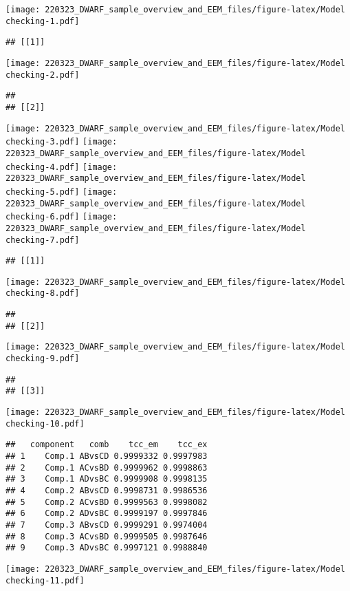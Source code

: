 \documentclass[
]{article}
\begin{document}
\texttt{[image: 220323\_DWARF\_sample\_overview\_and\_EEM\_files/figure-latex/Model checking-1.pdf]}

\begin{verbatim}
## [[1]]
\end{verbatim}

\texttt{[image: 220323\_DWARF\_sample\_overview\_and\_EEM\_files/figure-latex/Model checking-2.pdf]}

\begin{verbatim}
## 
## [[2]]
\end{verbatim}

\texttt{[image: 220323\_DWARF\_sample\_overview\_and\_EEM\_files/figure-latex/Model checking-3.pdf]}
\texttt{[image: 220323\_DWARF\_sample\_overview\_and\_EEM\_files/figure-latex/Model checking-4.pdf]}
\texttt{[image: 220323\_DWARF\_sample\_overview\_and\_EEM\_files/figure-latex/Model checking-5.pdf]}
\texttt{[image: 220323\_DWARF\_sample\_overview\_and\_EEM\_files/figure-latex/Model checking-6.pdf]}
\texttt{[image: 220323\_DWARF\_sample\_overview\_and\_EEM\_files/figure-latex/Model checking-7.pdf]}

\begin{verbatim}
## [[1]]
\end{verbatim}

\texttt{[image: 220323\_DWARF\_sample\_overview\_and\_EEM\_files/figure-latex/Model checking-8.pdf]}

\begin{verbatim}
## 
## [[2]]
\end{verbatim}

\texttt{[image: 220323\_DWARF\_sample\_overview\_and\_EEM\_files/figure-latex/Model checking-9.pdf]}

\begin{verbatim}
## 
## [[3]]
\end{verbatim}

\texttt{[image: 220323\_DWARF\_sample\_overview\_and\_EEM\_files/figure-latex/Model checking-10.pdf]}

\begin{verbatim}
##   component   comb    tcc_em    tcc_ex
## 1    Comp.1 ABvsCD 0.9999332 0.9997983
## 2    Comp.1 ACvsBD 0.9999962 0.9998863
## 3    Comp.1 ADvsBC 0.9999908 0.9998135
## 4    Comp.2 ABvsCD 0.9998731 0.9986536
## 5    Comp.2 ACvsBD 0.9999563 0.9998082
## 6    Comp.2 ADvsBC 0.9999197 0.9997846
## 7    Comp.3 ABvsCD 0.9999291 0.9974004
## 8    Comp.3 ACvsBD 0.9999505 0.9987646
## 9    Comp.3 ADvsBC 0.9997121 0.9988840
\end{verbatim}

\texttt{[image: 220323\_DWARF\_sample\_overview\_and\_EEM\_files/figure-latex/Model checking-11.pdf]}
\end{document}
